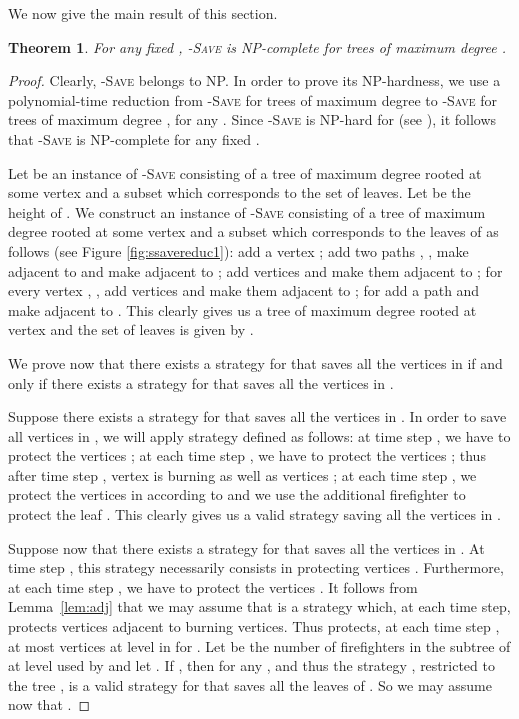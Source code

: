 \documentclass[10pt]{article}
\newtheorem{theorem}{Theorem}
\begin{document}
\noindent
We now give the main result of this section.

\begin{theorem}
\label{th:npc}
For any fixed , \textsc{-Save} is NP-complete for
trees of maximum degree .
\end{theorem}

\begin{proof}
Clearly, \textsc{-Save} belongs to NP. In order to prove its NP-hardness,
we use a polynomial-time reduction from \textsc{-Save}
for trees of maximum degree  to \textsc{-Save} for
trees of maximum degree , for any . Since \textsc{-Save} is NP-hard for  (see \cite{king2010}), it follows that \textsc{-Save} is NP-complete for any fixed .

Let  be an instance of \textsc{-Save} consisting of a tree
 of maximum degree  rooted at some vertex  and a subset  which corresponds
to the set of leaves. Let  be the height of . We construct an instance  of
\textsc{-Save} consisting of a tree  of maximum degree  rooted at some vertex  and a subset  which corresponds to the leaves of  as follows (see Figure \ref{fig:ssavereduc1}): add a vertex ; add two paths , , make  adjacent to  and make  adjacent to ; add vertices  and make them adjacent to ; for every vertex , , add vertices  and make them adjacent to ; for  add a path  and make  adjacent to . This clearly gives us a tree  of maximum degree  rooted at vertex  and the set of leaves  is given by .





\medskip
We prove now that there exists a strategy  for  that
saves all the vertices in  if and only if there exists a
strategy  for  that saves all the vertices in
.

\medskip
Suppose there exists a strategy  for  that saves all the
vertices in . In order to save all vertices in , we will
apply strategy  defined as follows: at time step
, we have to protect the vertices ; at each
time step , we have to protect the vertices ; thus after time step , vertex  is burning as well as vertices  ; at each time step , we protect the vertices in  according to  and we use the additional firefighter to protect the leaf . This clearly gives us a valid strategy 
saving all the vertices in .




\medskip
Suppose now that there exists a strategy  for  that
saves all the vertices in . At time step , this strategy necessarily consists in protecting vertices . Furthermore, at each time step , we have to protect the vertices . It follows from Lemma~\ref{lem:adj} that we may assume that 
is a strategy which, at each time step, protects vertices adjacent to burning vertices.
Thus  protects, at each time step , at most  vertices at level  in 
for .
Let  be the number of firefighters in the subtree  of  at level  used by  and let .
If , then for any ,  and thus the strategy , restricted to the tree , is a valid strategy for  that saves
all the leaves of . So we may assume now that .



\end{proof}
\end{document}
